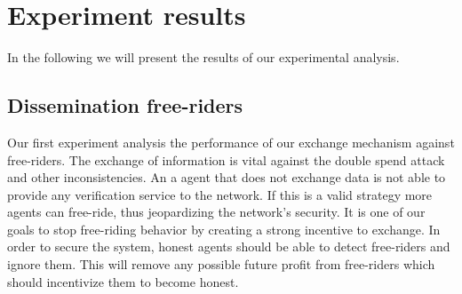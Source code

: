 \section{Experiment results}
In the following we will present the results of our experimental analysis.
\subsection{Dissemination free-riders}


Our first experiment analysis the performance of our exchange mechanism against free-riders. The 
exchange of information is vital against the double spend attack and other inconsistencies. An a
agent that does not exchange data is not able to provide any verification service to the network. If
this is a valid strategy more agents can free-ride, thus jeopardizing the network's security. It is 
one of our goals to stop free-riding behavior by creating a strong incentive to exchange. 
In order to secure the system, honest agents should be able to detect free-riders and ignore them.
This will remove any possible future profit from free-riders which should incentivize them to become honest.

